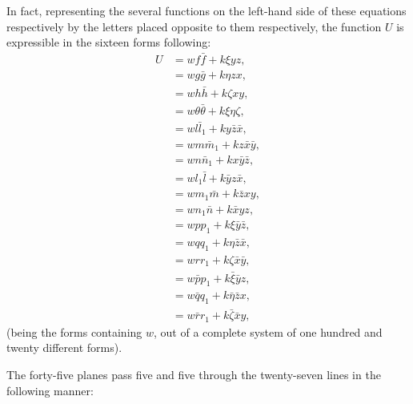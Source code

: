 \documentclass[12pt,a4paper]{article}
\begin{document}
In fact, representing the several functions on the left-hand side of these equations respectively by the letters placed opposite to them respectively, the function $U$ is expressible in the sixteen forms following:
\begin{align*}
U &= wf\bar{f} + k\xi yz, \\
  &= wg\bar{g} + k\eta zx, \\
  &= wh\bar{h} + k\zeta xy, \\
  &= w\theta\bar{\theta} + k\xi\eta\zeta, \\
  &= wl\bar{l}_1 + ky\bar{z}\bar{x}, \\
  &= wm\bar{m}_1 + kz\bar{x}\bar{y}, \\
  &= wn\bar{n}_1 + kx\bar{y}\bar{z}, \\
  &= wl_1\bar{l} + k\bar{y}z\bar{x}, \\
  &= wm_1\bar{m} + k\bar{z}xy, \\
  &= wn_1\bar{n} + k\bar{x}yz, \\
  &= wpp_1 + k\xi\bar{y}\bar{z}, \\
  &= wqq_1 + k\eta\bar{z}\bar{x}, \\
  &= wrr_1 + k\zeta\bar{x}\bar{y}, \\
  &= w\bar{p}p_1 + k\bar{\xi}\bar{y}z, \\
  &= w\bar{q}q_1 + k\bar{\eta}\bar{z}x, \\
  &= w\bar{r}r_1 + k\bar{\zeta}\bar{x}y,
\end{align*}
(being the forms containing $w$, out of a complete system of one hundred and twenty different forms).

The forty-five planes pass five and five through the twenty-seven lines in the following manner:
\medskip
\end{document}
